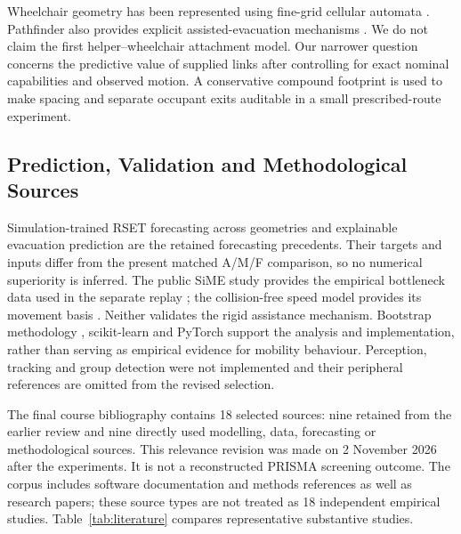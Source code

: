 Wheelchair geometry has been represented using fine-grid cellular automata \cite{r3}. Pathfinder also provides explicit assisted-evacuation mechanisms \cite{r4}. We do not claim the first helper--wheelchair attachment model. Our narrower question concerns the predictive value of supplied links after controlling for exact nominal capabilities and observed motion. A conservative compound footprint is used to make spacing and separate occupant exits auditable in a small prescribed-route experiment.

\subsection{Prediction, Validation and Methodological Sources}
Simulation-trained RSET forecasting across geometries \cite{r5} and explainable evacuation prediction \cite{L15} are the retained forecasting precedents. Their targets and inputs differ from the present matched A/M/F comparison, so no numerical superiority is inferred. The public SiME study provides the empirical bottleneck data used in the separate replay \cite{SIME}; the collision-free speed model provides its movement basis \cite{CFS}. Neither validates the rigid assistance mechanism. Bootstrap methodology \cite{r6}, scikit-learn \cite{SKLEARN} and PyTorch \cite{TORCH} support the analysis and implementation, rather than serving as empirical evidence for mobility behaviour. Perception, tracking and group detection were not implemented and their peripheral references are omitted from the revised selection.

The final course bibliography contains 18 selected sources: nine retained from the earlier review and nine directly used modelling, data, forecasting or methodological sources. This relevance revision was made on 2 November 2026 after the experiments. It is not a reconstructed PRISMA screening outcome. The corpus includes software documentation and methods references as well as research papers; these source types are not treated as 18 independent empirical studies. Table~\ref{tab:literature} compares representative substantive studies.


